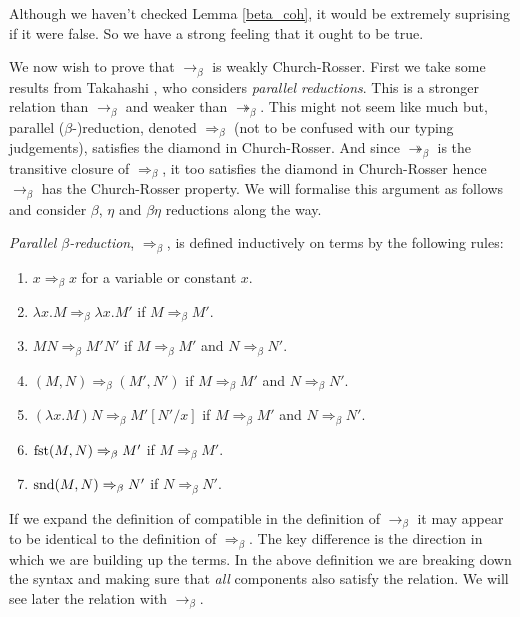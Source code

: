 \begin{remark}
    Although we haven't checked Lemma \ref{beta_coh}, it would be extremely suprising if it were false. So we have a strong feeling that it ought to be true. 
\end{remark}

We now wish to prove that $\to_\beta$ is weakly Church-Rosser. First we take some results from Takahashi \cite{TakahashiM1989PRIL, Takahashi:1995:PR9:207177.207191}, who considers \emph{parallel reductions}. This is a stronger relation than $\to_{\beta}$ and weaker than $\twoheadrightarrow_{\beta}$. This might not seem like much but, parallel ($\beta$-)reduction, denoted $\Rightarrow_{\beta}$ (not to be confused with our typing judgements), satisfies the diamond in Church-Rosser. And since $\twoheadrightarrow_{\beta}$ is the transitive closure of $\Rightarrow_{\beta}$, it too satisfies the diamond in Church-Rosser hence $\to_{\beta}$ has the Church-Rosser property. We will formalise this argument as follows and consider $\beta$, $\eta$ and $\beta \eta$ reductions along the way.

\begin{defin}
    \emph{Parallel $\beta$-reduction}, $\Rightarrow_{\beta}$, is defined inductively on terms by the following rules:
    \begin{enumerate}
        \item $x \Rightarrow_{\beta} x$ for a variable or constant $x$.
        \item $\lambda x . M \Rightarrow_{\beta} \lambda x . M'$ if $M \Rightarrow_{\beta} M'$.
        \item $MN \Rightarrow_{\beta} M' N'$ if $M \Rightarrow_{\beta} M'$ and $N \Rightarrow_{\beta} N'$.
        \item $(M, N) \Rightarrow_{\beta} (M', N')$ if $M \Rightarrow_{\beta} M'$ and $N \Rightarrow_{\beta} N'$.
        \item $(\lambda x . M)N \Rightarrow_{\beta} M'[N' / x]$ if $M \Rightarrow_{\beta} M'$ and $N \Rightarrow_{\beta} N'$.
        \item $\mathrm{fst}(M, N) \Rightarrow_{\beta} M'$ if $M \Rightarrow_{\beta} M'$.
        \item $\mathrm{snd}(M, N) \Rightarrow_{\beta} N'$ if $N \Rightarrow_{\beta} N'$.
    \end{enumerate}
\end{defin}

\begin{remark}
    If we expand the definition of compatible in the definition of $\to_{\beta}$ it may appear to be identical to the definition of $\Rightarrow_{\beta}$. The key difference is the direction in which we are building up the terms. In the above definition we are breaking down the syntax and making sure that \emph{all} components also satisfy the relation. We will see later the relation with $\to_{\beta}$.
\end{remark}

